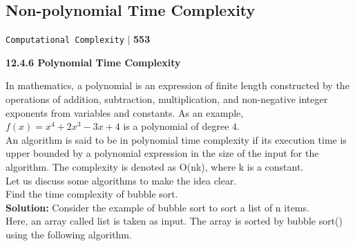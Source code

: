 \documentclass[9pt]{beamer}
\begin{document}
\begin{frame}
\section*{Non-polynomial Time Complexity }
\begin{flushright}
 \texttt{Computational Complexity} \hspace*{0.10cm}\textbf{$|$} \textbf{553}\hspace*{0.5cm}
\end{flushright}

\vspace*{0.5cm}
\large{
\textbf{12.4.6 Polynomial Time Complexity}\\
}

\vspace*{0.2cm}
\small{In mathematics, a polynomial is an expression of finite length constructed by the operations of addition,
subtraction, multiplication, and non-negative integer exponents from variables and constants. As an
example, $f(x) = x^{4} + 2x^{3} - 3x + 4$ is a polynomial of degree $4$.\\
\hspace*{0.5cm} An algorithm is said to be in polynomial time complexity if its execution time is upper bounded by
a polynomial expression in the size of the input for the algorithm. The complexity is denoted as O(nk),
where k is a constant.\\
\hspace*{0.5cm} Let us discuss some algorithms to make the idea clear.\\
}
\vspace*{0.3cm}
\hspace*{0.1cm} Find the time complexity of bubble sort.\\

\textbf{Solution:} Consider the example of bubble sort to sort a list of n items.\\
Here, an array called list is taken as input. The array is sorted by bubble sort() using the following
algorithm.\\
\end{frame}
\end{document}
